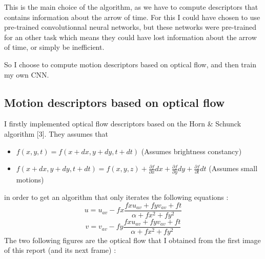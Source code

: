 \documentclass[10pt,a4paper]{report}
\begin{document}
		This is the main choice of the algorithm, as we have to compute descriptors that contains information about the arrow of time. For this I could have chosen to use pre-trained convolutionnal neural networks, but these networks were pre-trained for an other task which means they could have lost information about the arrow of time, or simply be inefficient.
		
		So I choose to compute motion descriptors based on optical flow, and then train my own CNN.  
		
		\subsection*{Motion descriptors based on optical flow}
		
		I firstly implemented optical flow descriptors based on the Horn \& Schunck algorithm [3]. They assumes that
		\begin{itemize}
			\item $f(x,y,t) = f(x+dx, y+dy, t+dt)$ (Assumes brightness constancy)
			\item $f(x+dx,y+dy,t+dt) = f(x,y,z) + \frac{\partial f}{\partial x}dx + \frac{\partial f}{\partial y}dy + \frac{\partial f}{\partial t}dt$ (Assumes small motions)
		\end{itemize}
		in order to get an algorithm that only iterates the following equations :
		\[u = u_{av} - fx\frac{fx u_{av} + fy v_{av} + ft}{\alpha + fx^2 + fy^2}\]
		\[v = v_{av} - fy\frac{fx u_{av} + fy v_{av} + ft}{\alpha + fx^2 + fy^2}\]
		The two following figures are the optical flow that I obtained from the first image of this report (and its next frame) :
\end{document}
